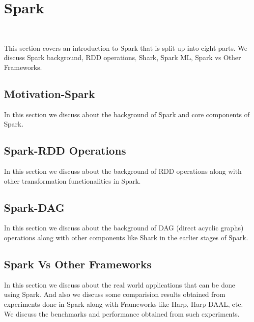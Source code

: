 \chapter{Spark}
\label{c:spark}
\FILENAME\

This section covers an introduction to Spark that is split up
into eight parts. We discuss Spark background, RDD operations,
Shark, Spark ML, Spark vs Other Frameworks.


\section{Motivation-Spark}
\label{s:motivation-spark}

In this section we discuss about the background of Spark and
core components of Spark.



\section{Spark-RDD Operations}

In this section we discuss about the background of RDD operations
along with other transformation functionalities in Spark.



\section{Spark-DAG}

In this section we discuss about the background of DAG (direct acyclic
graphs) operations along with other components like Shark in the
earlier stages of Spark.



\section{Spark Vs Other Frameworks}

In this section we discuss about the real world applications that can
be done using Spark.  And also we discuss some comparision results
obtained from experiments done in Spark along with Frameworks like
Harp, Harp DAAL, etc. We discuss the benchmarks and performance
obtained from such experiments.





